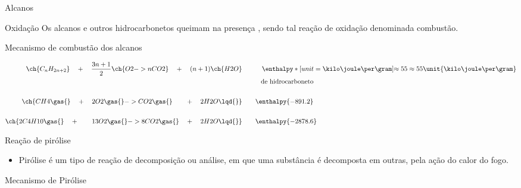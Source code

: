\documentclass{beamer}
\begin{document}
\begin{frame}[label={sec:orgefcf320}]{Alcanos}
\begin{block}{Oxidação}
Os \alert{alcanos} e outros \alert{hidrocarbonetos} queimam na presença , sendo tal reação de oxidação denominada
\alert{combustão}.


\begin{bclogo}[couleur=blue!30 , arrondi=0.1 , logo=\bcplume , epBarre=3.5]{Mecanismo de combustão dos alcanos}


\begin{align*}
\ch{C_nH_{2n+2}} \quad + \quad  \frac{3n+1}{2}\ch{O2 -> n CO2}\quad +\quad (n+1)\ch{H2O} & \qquad \quad \enthalpy*[unit=\kilo\joule\per\gram]{\approx 55} \approx 55 \unit{\kilo\joule\per\gram}\\ & \hspace{1cm} \mathrm{de~hidrocarboneto} \\ \\
\ch{CH4\gas{} \quad{} + \quad{} 2 O2\gas{} -> CO2\gas{} \qquad{} + \quad{} 2 H2O\lqd{}} & \quad \quad \enthalpy{-891.2}\\ \\
	\ch{2 C4H10\gas{} \quad{} + \qquad{} 13 O2\gas{} -> 8 CO2\gas{} \quad{} + \quad{} 2 H2O\lqd{}} & \quad \quad \enthalpy{-2878.6}    
\end{align*}
\end{bclogo}
\end{block}


\begin{block}{Reação de pirólise}
\begin{itemize}
\item \alert{Pirólise} é um tipo de reação de decomposição ou análise, em que uma substância é decomposta em outras, pela ação do calor do fogo.
\end{itemize}



\begin{bclogo}[couleur=blue!30 , arrondi=0.1 , logo=\bcplume , epBarre=3.5]{Mecanismo de Pirólise}




\end{bclogo}
\end{block}
\end{frame}
\end{document}
